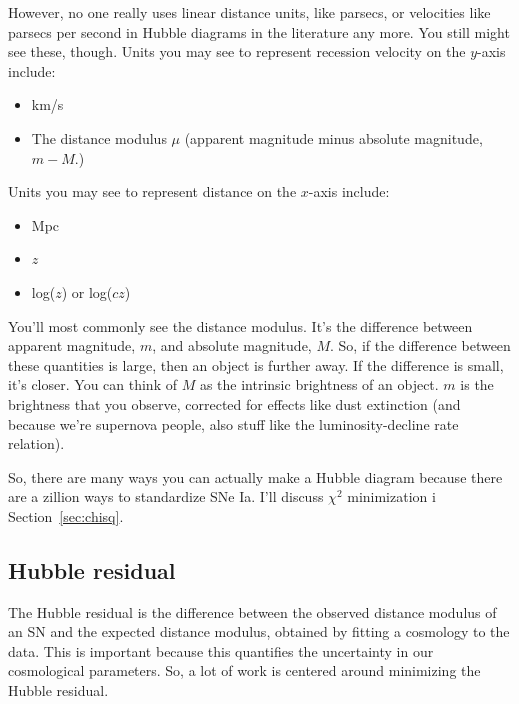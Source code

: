 However, no one really uses linear distance units, like parsecs, or velocities like parsecs per second in Hubble diagrams in the literature any more. You still might see these, though. Units you may see to represent recession velocity on the $y$-axis include:
\begin{itemize}
    \item km/s
    \item The distance modulus $\mu$ (apparent magnitude minus absolute magnitude, $m-M$.)
\end{itemize}
Units you may see to represent distance on the $x$-axis include:
\begin{itemize}
    \item Mpc
    \item $z$
    \item log($z$) or log($cz$)
\end{itemize}
You'll most commonly see the distance modulus. It's the difference between apparent magnitude, $m$, and absolute magnitude, $M$. So, if the difference between these quantities is large, then an object is further away. If the difference is small, it's closer. You can think of $M$ as the intrinsic brightness of an object. $m$ is the brightness that you observe, corrected for effects like dust extinction (and because we're supernova people, also stuff like the luminosity-decline rate relation). 

So, there are many ways you can actually make a Hubble diagram because there are a zillion ways to standardize SNe Ia. I'll discuss $\chi^{2}$ minimization i Section~\ref{sec:chisq}. 

\subsection{Hubble residual}
The Hubble residual is the difference between the observed distance modulus of an SN and the expected distance modulus, obtained by fitting a cosmology to the data. This is important because this quantifies the uncertainty in our cosmological parameters. So, a lot of work is centered around minimizing the Hubble residual. 

